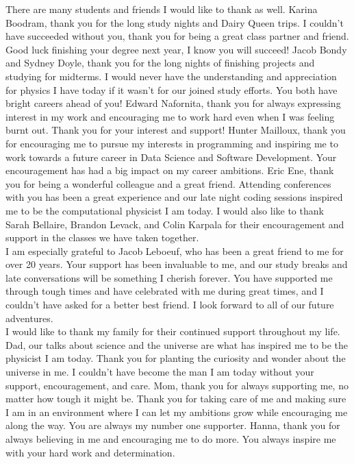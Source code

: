 \documentclass[12pt,oneside,final]{vlsithesis}
\numberwithin{equation}{chapter}
\begin{document}
{There are many students and friends I would like to thank as well. Karina Boodram, thank you for the long study nights and Dairy Queen trips. I couldn't have succeeded without you, thank you for being a great class partner and friend. Good luck finishing your degree next year, I know you will succeed! Jacob Bondy and Sydney Doyle, thank you for the long nights of finishing projects and studying for midterms. I would never have the understanding and appreciation for physics I have today if it wasn't for our joined study efforts. You both have bright careers ahead of you! Edward Nafornita, thank you for always expressing interest in my work and encouraging me to work hard even when I was feeling burnt out. Thank you for your interest and support! Hunter Mailloux, thank you for encouraging me to pursue my interests in programming and inspiring me to work towards a future career in Data Science and Software Development. Your encouragement has had a big impact on my career ambitions. Eric Ene, thank you for being a wonderful colleague and a great friend. Attending conferences with you has been a great experience and our late night coding sessions inspired me to be the computational physicist I am today. I would also like to thank Sarah Bellaire, Brandon Levack, and Colin Karpala for their encouragement and support in the classes we have taken together. \\

I am especially grateful to Jacob Leboeuf, who has been a great friend to me for over 20 years. Your support has been invaluable to me, and our study breaks and late conversations will be something I cherish forever. You have supported me through tough times and have celebrated with me during great times, and I couldn't have asked for a better best friend. I look forward to all of our future adventures.\\

I would like to thank my family for their continued support throughout my life. Dad, our talks about science and the universe are what has inspired me to be the physicist I am today. Thank you for planting the curiosity and wonder about the universe in me. I couldn't have become the man I am today without your support, encouragement, and care. Mom, thank you for always supporting me, no matter how tough it might be. Thank you for taking care of me and making sure I am in an environment where I can let my ambitions grow while encouraging me along the way. You are always my number one supporter. Hanna, thank you for always believing in me and encouraging me to do more. You always inspire me with your hard work and determination.\\

}
\end{document}
